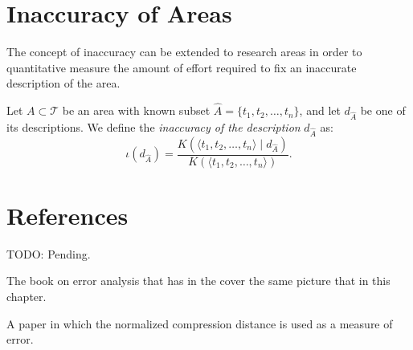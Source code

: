 %
%

\section{Inaccuracy of Areas}

The concept of inaccuracy can be extended to research areas in order to quantitative measure the amount of effort required to fix an inaccurate description of the area.

\begin{definition}
Let $A \subset \mathcal{T}$ be an area with known subset $\hat{A} = \{t_1, t_2, \ldots, t_n\}$, and let $d_{\hat{A}}$ be one of its descriptions. We define the \emph{inaccuracy of the description} $d_{\hat{A}}$ as:
\[
\iota(d_{\hat{A}}) = \frac{ K(\langle t_1, t_2, \ldots, t_n \rangle \mid d_{\hat{A}}) } {K(\langle t_1, t_2, \ldots, t_n \rangle)}.
\]
\end{definition}

%
%

\section*{References}

{\color{red} TODO: Pending.}

The book on error analysis that has in the cover the same picture that in this chapter.

A paper in which the normalized compression distance is used as a measure of error.



